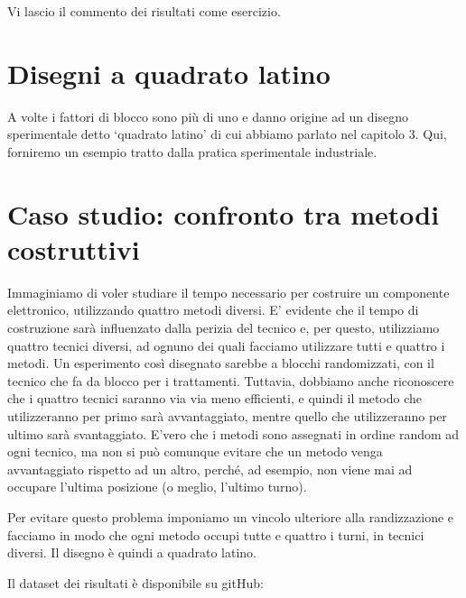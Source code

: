 \documentclass[a4paper,12pt,oneside]{book}
\begin{document}
Vi lascio il commento dei risultati come esercizio.

\hypertarget{disegni-a-quadrato-latino-1}{%
\section{Disegni a quadrato latino}\label{disegni-a-quadrato-latino-1}}

A volte i fattori di blocco sono più di uno e danno origine ad un disegno sperimentale detto `quadrato latino' di cui abbiamo parlato nel capitolo 3. Qui, forniremo un esempio tratto dalla pratica sperimentale industriale.

\hypertarget{caso-studio-confronto-tra-metodi-costruttivi}{%
\section{Caso studio: confronto tra metodi costruttivi}\label{caso-studio-confronto-tra-metodi-costruttivi}}

Immaginiamo di voler studiare il tempo necessario per costruire un componente elettronico, utilizzando quattro metodi diversi. E' evidente che il tempo di costruzione sarà influenzato dalla perizia del tecnico e, per questo, utilizziamo quattro tecnici diversi, ad ognuno dei quali facciamo utilizzare tutti e quattro i metodi. Un esperimento così disegnato sarebbe a blocchi randomizzati, con il tecnico che fa da blocco per i trattamenti. Tuttavia, dobbiamo anche riconoscere che i quattro tecnici saranno via via meno efficienti, e quindi il metodo che utilizzeranno per primo sarà avvantaggiato, mentre quello che utilizzeranno per ultimo sarà svantaggiato. E'vero che i metodi sono assegnati in ordine random ad ogni tecnico, ma non si può comunque evitare che un metodo venga avvantaggiato rispetto ad un altro, perché, ad esempio, non viene mai ad occupare l'ultima posizione (o meglio, l'ultimo turno).

Per evitare questo problema imponiamo un vincolo ulteriore alla randizzazione e facciamo in modo che ogni metodo occupi tutte e quattro i turni, in tecnici diversi. Il disegno è quindi a quadrato latino.

Il dataset dei risultati è disponibile su gitHub:
\end{document}
